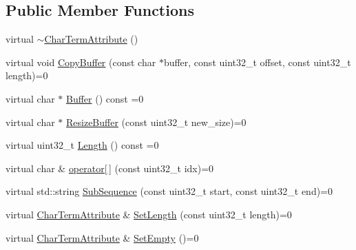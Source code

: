 \subsection*{Public Member Functions}
\begin{DoxyCompactItemize}
\item 
virtual \mbox{\hyperlink{classlucene_1_1core_1_1analysis_1_1tokenattributes_1_1CharTermAttribute_a44922cdddac47f06e60c0e69c78599ad}{$\sim$\+Char\+Term\+Attribute}} ()
\item 
virtual void \mbox{\hyperlink{classlucene_1_1core_1_1analysis_1_1tokenattributes_1_1CharTermAttribute_ae03cbeb05b5b1e7c50f407e0025d41da}{Copy\+Buffer}} (const char $\ast$buffer, const uint32\+\_\+t offset, const uint32\+\_\+t length)=0
\item 
virtual char $\ast$ \mbox{\hyperlink{classlucene_1_1core_1_1analysis_1_1tokenattributes_1_1CharTermAttribute_abc9fbea4b68b4cdbb1d120970c71d38e}{Buffer}} () const =0
\item 
virtual char $\ast$ \mbox{\hyperlink{classlucene_1_1core_1_1analysis_1_1tokenattributes_1_1CharTermAttribute_ada68e9c9011b5ac61e9a34caf63aba6d}{Resize\+Buffer}} (const uint32\+\_\+t new\+\_\+size)=0
\item 
virtual uint32\+\_\+t \mbox{\hyperlink{classlucene_1_1core_1_1analysis_1_1tokenattributes_1_1CharTermAttribute_a1e81ad4ff6bc6141f5a6e103cdf7f36d}{Length}} () const =0
\item 
virtual char \& \mbox{\hyperlink{classlucene_1_1core_1_1analysis_1_1tokenattributes_1_1CharTermAttribute_af6a554c50515313093c1ac61c3bddbe7}{operator\mbox{[}$\,$\mbox{]}}} (const uint32\+\_\+t idx)=0
\item 
virtual std\+::string \mbox{\hyperlink{classlucene_1_1core_1_1analysis_1_1tokenattributes_1_1CharTermAttribute_af97534d3a549afbbddd5f64b97efc5a4}{Sub\+Sequence}} (const uint32\+\_\+t start, const uint32\+\_\+t end)=0
\item 
virtual \mbox{\hyperlink{classlucene_1_1core_1_1analysis_1_1tokenattributes_1_1CharTermAttribute}{Char\+Term\+Attribute}} \& \mbox{\hyperlink{classlucene_1_1core_1_1analysis_1_1tokenattributes_1_1CharTermAttribute_a8186262029561e196e991fc543cd9953}{Set\+Length}} (const uint32\+\_\+t length)=0
\item 
virtual \mbox{\hyperlink{classlucene_1_1core_1_1analysis_1_1tokenattributes_1_1CharTermAttribute}{Char\+Term\+Attribute}} \& \mbox{\hyperlink{classlucene_1_1core_1_1analysis_1_1tokenattributes_1_1CharTermAttribute_ac14e6e064418d1d56b0f33724dcfe8b0}{Set\+Empty}} ()=0
\item 

\end{DoxyCompactItemize}
